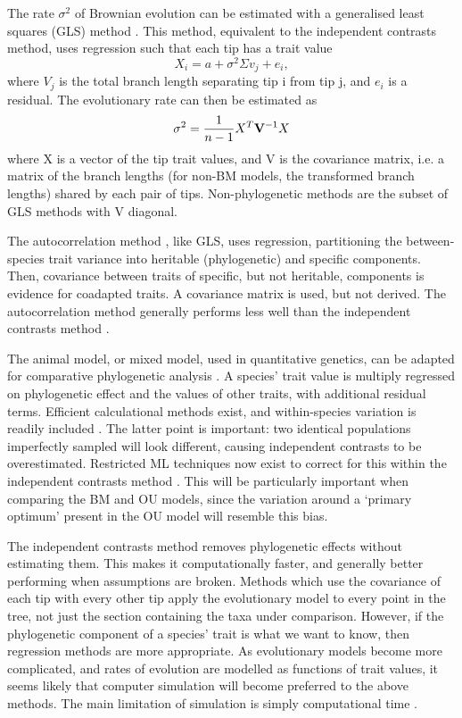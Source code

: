 \documentclass[12pt]{article}
\begin{document}
The rate $\sigma^2$ of Brownian evolution can be estimated with a generalised least squares (GLS) method \citep{pagel_inferring_1997}. This method, equivalent to the independent contrasts method, uses regression such that each tip has a trait value
\begin{equation}
	X_i = a + \sigma^2 \Sigma v_j + e_i,
\end{equation}
where $V_j$ is the total branch length separating tip i from tip j, and $e_i$ is a residual. The evolutionary rate can then be estimated as
\begin{equation}
	\sigma^2 = \frac{1}{n-1} X^T \bold{V}^{-1} X
\end{equation}
where X is a vector of the tip trait values, and V is the covariance matrix, i.e. a matrix of the branch lengths (for non-BM models, the transformed branch lengths) shared by each pair of tips. Non-phylogenetic methods are the subset of GLS methods with V diagonal.

The autocorrelation method \citep{cheverud_quantitative_1985}, like GLS, uses regression, partitioning the between-species trait variance into heritable (phylogenetic) and specific components. Then, covariance between traits of specific, but not heritable, components is evidence for coadapted traits. A covariance matrix is used, but not derived. The autocorrelation method generally performs less well than the independent contrasts method \citep{diaz-uriarte_testing_1996}. 

The animal model, or mixed model, used in quantitative genetics, can be adapted for comparative phylogenetic analysis \citep{lynch_methods_1991}. A species' trait value is multiply regressed on phylogenetic effect and the values of other traits, with additional residual terms. Efficient calculational methods exist, and within-species variation is readily included \citep{hadfield_general_2010}. The latter point is important: two identical populations imperfectly sampled will look different, causing independent contrasts to be overestimated. Restricted ML techniques now exist to correct for this within the independent contrasts method \citep{ives_within-species_2007,felsenstein_comparative_2008}. This will be particularly important when comparing the BM and OU models, since the variation around a `primary optimum' present in the OU model will resemble this bias. 


The independent contrasts method removes phylogenetic effects without estimating them. This makes it computationally faster, and generally better performing when assumptions are broken. Methods which use the covariance of each tip with every other tip apply the evolutionary model to every point in the tree, not just the section containing the taxa under comparison. However, if the phylogenetic component of a species' trait is what we want to know, then regression methods are more appropriate. As evolutionary models become more complicated, and rates of evolution are modelled as functions of trait values, it seems likely that computer simulation will become preferred to the above methods. The main limitation of simulation is simply computational time \citep{garland_introduction_1999}. 
\end{document}
